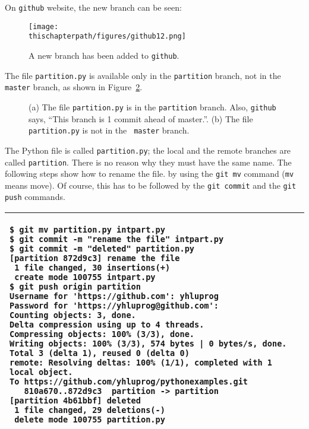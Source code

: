 \clearpage

On {\tt github} website, the new branch can be seen:

\begin{figure}[h] \centering
{\texttt{[image: \\thischapterpath/figures/github12.png]}}
\caption{A new branch has been added to {\tt github}.}
\label{fig:github12}
\end{figure}

The file {\tt partition.py} is available only in the {\tt partition}
branch, not in the {\tt master} branch, as shown in
Figure~\ref{fig:github134}.

\begin{figure}[h] \centering
\caption{(a) The file {\tt partition.py} is in the {\tt partition}
  branch.  Also, {\tt github} says, ``This branch is 1 commit ahead of
  master.''.  (b) The file {\tt partition.py} is not in the {\tt
    master} branch.}
\label{fig:github134}
\end{figure}

\clearpage

The Python file is called {\tt partition.py}; the local and the remote
branches are called {\tt partition}.  There is no reason why they must
have the same name.  The following steps show how to rename the file.
by using the {\tt git mv} command ({\tt mv} means move). Of course,
this has to be followed by the {\tt git commit} and the {\tt git push}
commands.


\clearpage
\vspace{0.2in}
\noindent
\begin{tabular}{|p{5.5in}|}\hline
\begin{verbatim}
$ git mv partition.py intpart.py
$ git commit -m "rename the file" intpart.py 
$ git commit -m "deleted" partition.py
[partition 872d9c3] rename the file
 1 file changed, 30 insertions(+)
 create mode 100755 intpart.py
$ git push origin partition
Username for 'https://github.com': yhluprog
Password for 'https://yhluprog@github.com': 
Counting objects: 3, done.
Delta compression using up to 4 threads.
Compressing objects: 100% (3/3), done.
Writing objects: 100% (3/3), 574 bytes | 0 bytes/s, done.
Total 3 (delta 1), reused 0 (delta 0)
remote: Resolving deltas: 100% (1/1), completed with 1 local object.
To https://github.com/yhluprog/pythonexamples.git
   810a670..872d9c3  partition -> partition
[partition 4b61bbf] deleted
 1 file changed, 29 deletions(-)
 delete mode 100755 partition.py
\end{verbatim}
\\ \hline
\end{tabular}
\vspace{0.2in}


